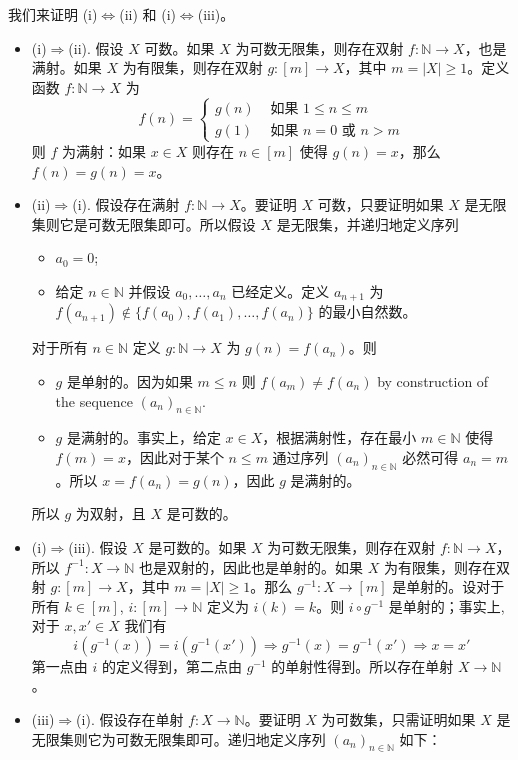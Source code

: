 \begin{cproof}
我们来证明 (i)$\Leftrightarrow$(ii) 和 (i)$\Leftrightarrow$(iii)。
\begin{itemize}
\item (i)$\Rightarrow$(ii). 假设 $X$ 可数。如果 $X$ 为可数无限集，则存在双射 $f : \mathbb{N} \to X$，也是满射。如果 $X$ 为有限集，则存在双射 $g : [m] \to X$，其中 $m = |X| \ge 1$。定义函数 $f : \mathbb{N} \to X$ 为
\[ f(n) = \begin{cases} g(n) & \text{ 如果 } 1 \le n \le m \\ g(1) & \text{ 如果 } n=0 \text{ 或 } n > m \end{cases} \]
则 $f$ 为满射：如果 $x \in X$ 则存在 $n \in [m]$ 使得 $g(n)=x$，那么 $f(n)=g(n)=x$。
\item (ii)$\Rightarrow$(i). 假设存在满射 $f : \mathbb{N} \to X$。要证明 $X$ 可数，只要证明如果 $X$ 是无限集则它是可数无限集即可。所以假设 $X$ 是无限集，并递归地定义序列
\begin{itemize}
\item $a_0=0$;
\item 给定 $n \in \mathbb{N}$ 并假设 $a_0, \dots, a_n$ 已经定义。定义 $a_{n+1}$ 为 $f(a_{n+1}) \not \in \{ f(a_0), f(a_1), \dots, f(a_n) \}$ 的最小自然数。
\end{itemize}
对于所有 $n \in \mathbb{N}$ 定义 $g : \mathbb{N} \to X$ 为 $g(n)=f(a_n)$。则
\begin{itemize}
\item $g$ 是单射的。因为如果 $m \le n$ 则 $f(a_m) \ne f(a_n)$ by construction of the sequence $(a_n)_{n \in \mathbb{N}}$.
\item $g$ 是满射的。事实上，给定 $x \in X$，根据满射性，存在最小 $m \in \mathbb{N}$ 使得 $f(m)=x$，因此对于某个 $n \le m$ 通过序列 $(a_n)_{n \in \mathbb{N}}$ 必然可得 $a_n=m$。所以 $x = f(a_n) = g(n)$，因此 $g$ 是满射的。
\end{itemize}
所以 $g$ 为双射，且 $X$ 是可数的。
\item (i)$\Rightarrow$(iii). 假设 $X$ 是可数的。如果 $X$ 为可数无限集，则存在双射 $f : \mathbb{N} \to X$，所以 $f^{-1} : X \to \mathbb{N}$ 也是双射的，因此也是单射的。如果 $X$ 为有限集，则存在双射 $g : [m] \to X$，其中 $m=|X| \ge 1$。那么 $g^{-1} : X \to [m]$ 是单射的。设对于所有 $k \in [m]$, $i : [m] \to \mathbb{N}$ 定义为 $i(k)=k$。则 $i \circ g^{-1}$ 是单射的；事实上, 对于 $x,x' \in X$ 我们有
\[ i(g^{-1}(x))=i(g^{-1}(x')) \Rightarrow g^{-1}(x)=g^{-1}(x') \Rightarrow x=x' \]
第一点由 $i$ 的定义得到，第二点由 $g^{-1}$ 的单射性得到。所以存在单射 $X \to \mathbb{N}$。
\item (iii)$\Rightarrow$(i). 假设存在单射 $f : X \to \mathbb{N}$。要证明 $X$ 为可数集，只需证明如果 $X$ 是无限集则它为可数无限集即可。递归地定义序列 $(a_n)_{n \in \mathbb{N}}$ 如下：

\end{itemize}
\end{cproof}

